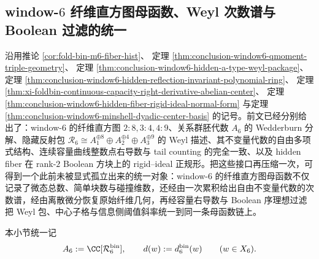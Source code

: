 \subsection{window-\texorpdfstring{$6$}{6} 纤维直方图母函数、Weyl 次数谱与 Boolean 过滤的统一}\label{subsec:conclusion-window6-histogram-generator-weyl-hilbert-capacity-orderideal}

沿用推论 \ref{cor:fold-bin-m6-fiber-hist}、
定理 \ref{thm:conclusion-window6-qmoment-triple-geometry}、
定理 \ref{thm:conclusion-window6-hidden-a-type-weyl-package}、
定理 \ref{thm:conclusion-window6-hidden-reflection-invariant-polynomial-ring}、
定理 \ref{thm:xi-foldbin-continuous-capacity-right-derivative-abelian-center}、
定理 \ref{thm:conclusion-window6-hidden-fiber-rigid-ideal-normal-form}
与定理 \ref{thm:conclusion-window6-minshell-dyadic-center-basis}
的记号。前文已经分别给出了：window-\(6\) 的纤维直方图 \(2{:}8,3{:}4,4{:}9\)、关系群胚代数 \(A_6\) 的 Wedderburn 分解、隐藏反射包 \(\mathscr R_6\cong A_1^{\oplus 8}\oplus A_2^{\oplus 4}\oplus A_3^{\oplus 9}\) 的 Weyl 描述、其不变量代数的自由多项式结构、连续容量曲线整数点右导数与 tail counting 的完全一致、以及 hidden fiber 在 rank-\(2\) Boolean 方块上的 rigid--ideal 正规形。把这些接口再压缩一次，可得到一个此前未被显式孤立出来的统一对象：window-\(6\) 的纤维直方图母函数不仅记录了微态总数、简单块数与碰撞维数，还经由一次累积给出自由不变量代数的次数谱，经由离散微分恢复原始纤维几何，再经容量右导数与 Boolean 序理想过滤把 Weyl 包、中心子格与信息侧阈值斜率统一到同一条母函数链上。

本小节统一记
\[
A_6:=\CC[\mathcal R_6^{\mathrm{bin}}],
\qquad
d(w):=d_6^{\mathrm{bin}}(w)
\qquad (w\in X_6).
\]

